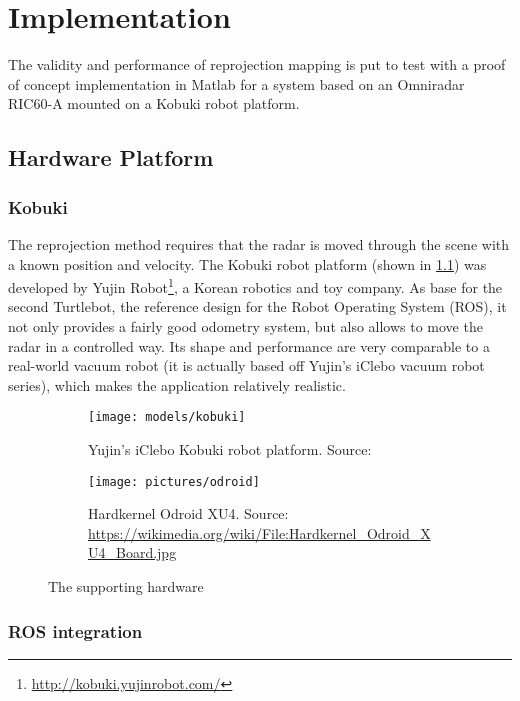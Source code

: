 \chapter{Implementation}\label{implementation}

The validity and performance of reprojection mapping is put to test with a proof of concept implementation in Matlab for a system based on an Omniradar RIC60-A mounted on a Kobuki robot platform.

\section{Hardware Platform}\label{implementation-platform}

\subsection{Kobuki}\label{kobuki}

The reprojection method requires that the radar is moved through the scene with a known position and velocity. The Kobuki robot platform (shown in \cref{fig:kobuki}) was developed by Yujin Robot\footnote{\url{http://kobuki.yujinrobot.com/}}, a Korean robotics and toy company. As base for the second Turtlebot, the reference design for the Robot Operating System (ROS), it not only provides a fairly good odometry system, but also allows to move the radar in a controlled way. Its shape and performance are very comparable to a real-world vacuum robot (it is actually based off Yujin's iClebo vacuum robot series), which makes the application relatively realistic.

\begin{figure}[htbp]
    \centering
    \begin{subfigure}{0.45\textwidth}
        \texttt{[image: models/kobuki]}
        \caption{Yujin's iClebo Kobuki robot platform. Source: \cite{DesignK2013}}
        \label{fig:kobuki}
    \end{subfigure}
    \hfill
    \begin{subfigure}{0.45\textwidth}
        \texttt{[image: pictures/odroid]}
        \caption{Hardkernel Odroid XU4. Source: \url{https://wikimedia.org/wiki/File:Hardkernel_Odroid_XU4_Board.jpg}}
        \label{fig:odroid}
    \end{subfigure}
    \caption{The supporting hardware} \label{fig:hardware}
\end{figure}

\subsection{ROS integration}\label{ros-integration}

